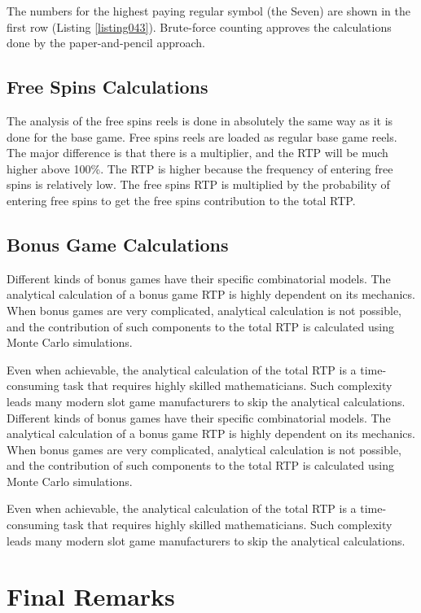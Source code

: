 \documentclass[12pt,twoside,openany]{book}
\begin{document}
The numbers for the highest paying regular symbol (the Seven) are shown in the first row (Listing \ref{listing043}). Brute-force counting approves the calculations done by the paper-and-pencil approach.

\section*{Free Spins Calculations}

The analysis of the free spins reels is done in absolutely the same way as it is done for the base game. Free spins reels are loaded as regular base game reels. The major difference is that there is a multiplier, and the RTP will be much higher above 100\%. The RTP is higher because the frequency of entering free spins is relatively low. The free spins RTP is multiplied by the probability of entering free spins to get the free spins contribution to the total RTP.

\section*{Bonus Game Calculations}

Different kinds of bonus games have their specific combinatorial models. The analytical calculation of a bonus game RTP is highly dependent on its mechanics. When bonus games are very complicated, analytical calculation is not possible, and the contribution of such components to the total RTP is calculated using Monte Carlo simulations.

Even when achievable, the analytical calculation of the total RTP is a time-consuming task that requires highly skilled mathematicians. Such complexity leads many modern slot game manufacturers to skip the analytical calculations.
Different kinds of bonus games have their specific combinatorial models. The analytical calculation of a bonus game RTP is highly dependent on its mechanics. When bonus games are very complicated, analytical calculation is not possible, and the contribution of such components to the total RTP is calculated using Monte Carlo simulations.

Even when achievable, the analytical calculation of the total RTP is a time-consuming task that requires highly skilled mathematicians. Such complexity leads many modern slot game manufacturers to skip the analytical calculations.
\chapter*{Final Remarks}
\end{document}
